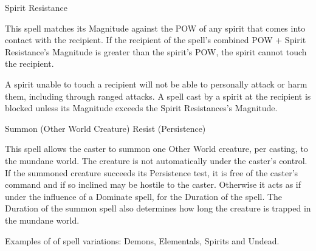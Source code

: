 \begin{rpg-spell}
{Spirit Resistance}
{}

This spell matches its Magnitude against the POW of any spirit that comes into contact with the recipient. If the recipient of the spell’s combined POW + Spirit Resistance’s Magnitude is greater than the spirit’s POW, the spirit cannot touch the recipient. 

A spirit unable to touch a recipient will not be able to personally attack or harm them, including through ranged attacks. A spell cast by a spirit at the recipient is blocked unless its Magnitude exceeds the Spirit Resistances’s Magnitude. 
\end{rpg-spell}


\begin{rpg-spell}
{Summon (Other World Creature)}
{Resist (Persistence)}

This spell allows the caster to summon one Other World creature, per casting, to the mundane world. The creature is not automatically under the caster’s control. If the summoned creature succeeds its Persistence test, it is free of the caster's command and if so inclined may be hostile to the caster. Otherwise it acts as if under the influence of a Dominate spell, for the Duration of the spell. The Duration of the summon spell also determines how long the creature is trapped in the mundane world.

Examples of of spell variations: Demons, Elementals, Spirits and Undead.
\end{rpg-spell}


